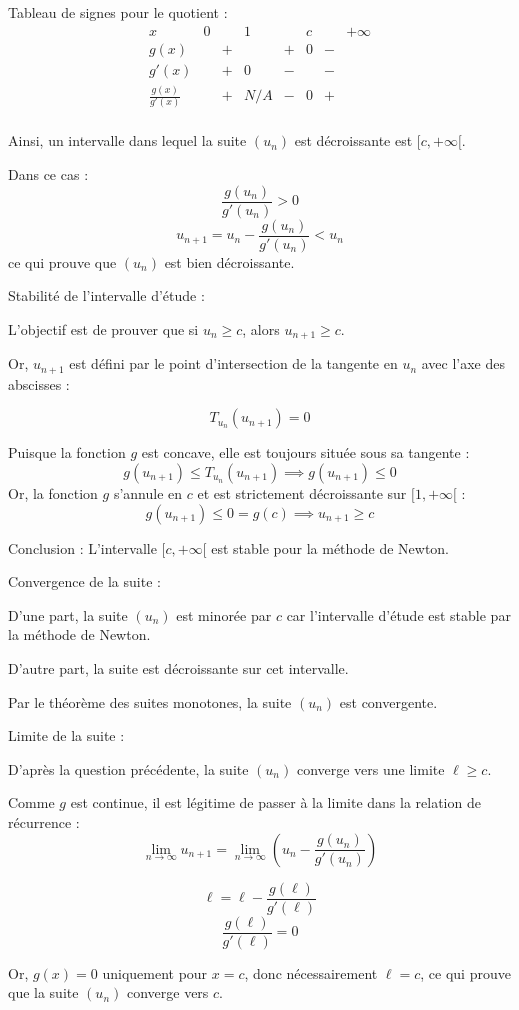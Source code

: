 \documentclass[10pt,a4paper]{article}
\begin{document}
Tableau de signes pour le quotient :
\[
\begin{array}{c|ccccccc}
x & 0 &  & 1 &  & c & & +\infty \\
\hline
g(x) & & + &  & + & 0 & - &  \\
\hline
g'(x) &  & + & 0 & - &  & - &  \\
\hline
\frac{g(x)}{g'(x)} & & + & N/A & - & 0 & + &  \\
\end{array}
\]

Ainsi, un intervalle dans lequel la suite \( (u_n) \) est décroissante est \( [c , +\infty[ \).

Dans ce cas :
\[
\frac{g(u_n)}{g'(u_n)} > 0
\]
\[
u_{n+1} = u_n - \frac{g(u_n)}{g'(u_n)} < u_n
\]
ce qui prouve que \( (u_n) \) est bien décroissante.


\q Stabilité de l'intervalle d'étude :

L'objectif est de prouver que si \( u_n \geq c \), alors \( u_{n+1} \geq c \).

Or, \( u_{n+1} \) est défini par le point d'intersection de la tangente en  \( u_n \) avec l'axe des
abscisses :

\[
T_{u_n}(u_{n+1}) = 0
\]

Puisque la fonction \( g \) est concave, elle est toujours située sous sa tangente :
\[
g(u_{n+1}) \leq T_{u_n}(u_{n+1}) \implies g(u_{n+1}) \leq 0
\]
Or, la fonction \( g \) s'annule en \( c \) et est strictement décroissante sur \( [1, +\infty[ \) :
\[
g(u_{n+1}) \leq 0 = g(c) \implies u_{n+1} \geq c
\]

Conclusion : L'intervalle \( [c, +\infty[ \) est stable pour la méthode de Newton.


\q Convergence de la suite :

D'une part, la suite \( (u_n) \) est minorée par \( c \) car l'intervalle d'étude est stable par la
méthode de Newton.

D'autre part, la suite est décroissante sur cet intervalle.

Par le théorème des suites monotones, la suite \( (u_n) \) est convergente.


\q Limite de la suite :

D'après la question précédente, la suite \( (u_n) \) converge vers une limite \( \ell \geq c \).

Comme \( g \) est continue, il est légitime de passer à la limite dans la relation de récurrence :
\[
\lim_{n \to \infty} u_{n+1} = \lim_{n \to \infty} \left( u_n - \frac{g(u_n)}{g'(u_n)} \right)
\]

\[
\ell = \ell - \frac{g(\ell)}{g'(\ell)}
\]
\[
\frac{g(\ell)}{g'(\ell)} = 0
\]

Or, \( g(x) = 0 \) uniquement pour \( x = c \), donc nécessairement \( \ell = c \), ce qui prouve
que la suite \( (u_n) \) converge vers \( c \).
\end{document}
